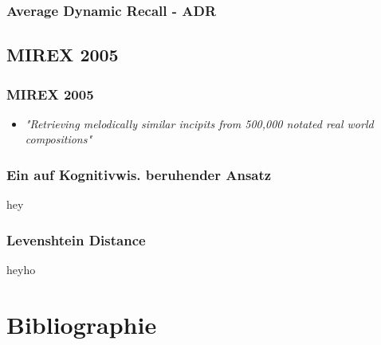 \documentclass{beamer}
\begin{document}
	\begin{frame}
		\frametitle{Average Dynamic Recall - ADR}
		
	\end{frame}

	\subsection{MIREX 2005}

	\begin{frame}
		\frametitle{MIREX 2005}
		\begin{itemize}
			\item \textit{"Retrieving melodically similar incipits from 500,000 notated real world compositions"}\cite{mirex_website}
		\end{itemize}
	\end{frame}

	\subsubsection{Ein auf Kognitivwis. beruhender Ansatz}
		
		\begin{frame}
			hey
		\end{frame}
	\subsubsection{Levenshtein Distance}
		\begin{frame}
			heyho
		\end{frame}


	\section{Bibliographie}
\end{document}
